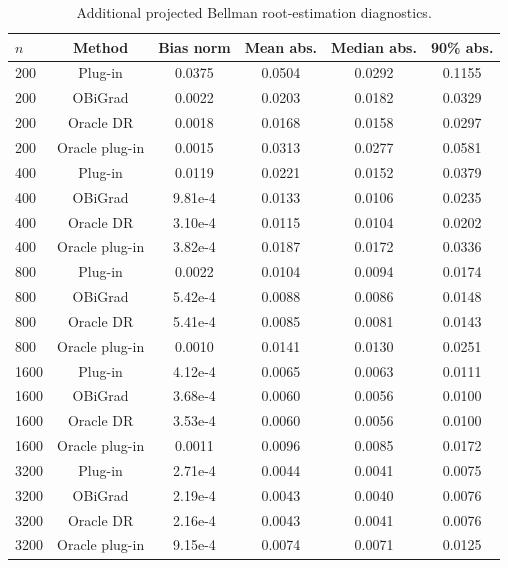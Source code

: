 \begin{table}[t]
\centering
\small
\setlength{\tabcolsep}{5pt}
\caption{Additional projected Bellman root-estimation diagnostics.}
\label{tab:generated-bellman-b3-root-appendix}
\begin{tabular}{lccccc}
\toprule
$n$ & Method & Bias norm & Mean abs. & Median abs. & 90\% abs. \\
\midrule
200 & Plug-in & 0.0375 & 0.0504 & 0.0292 & 0.1155 \\
200 & OBiGrad & 0.0022 & 0.0203 & 0.0182 & 0.0329 \\
200 & Oracle DR & 0.0018 & 0.0168 & 0.0158 & 0.0297 \\
200 & Oracle plug-in & 0.0015 & 0.0313 & 0.0277 & 0.0581 \\
400 & Plug-in & 0.0119 & 0.0221 & 0.0152 & 0.0379 \\
400 & OBiGrad & 9.81e-4 & 0.0133 & 0.0106 & 0.0235 \\
400 & Oracle DR & 3.10e-4 & 0.0115 & 0.0104 & 0.0202 \\
400 & Oracle plug-in & 3.82e-4 & 0.0187 & 0.0172 & 0.0336 \\
800 & Plug-in & 0.0022 & 0.0104 & 0.0094 & 0.0174 \\
800 & OBiGrad & 5.42e-4 & 0.0088 & 0.0086 & 0.0148 \\
800 & Oracle DR & 5.41e-4 & 0.0085 & 0.0081 & 0.0143 \\
800 & Oracle plug-in & 0.0010 & 0.0141 & 0.0130 & 0.0251 \\
1600 & Plug-in & 4.12e-4 & 0.0065 & 0.0063 & 0.0111 \\
1600 & OBiGrad & 3.68e-4 & 0.0060 & 0.0056 & 0.0100 \\
1600 & Oracle DR & 3.53e-4 & 0.0060 & 0.0056 & 0.0100 \\
1600 & Oracle plug-in & 0.0011 & 0.0096 & 0.0085 & 0.0172 \\
3200 & Plug-in & 2.71e-4 & 0.0044 & 0.0041 & 0.0075 \\
3200 & OBiGrad & 2.19e-4 & 0.0043 & 0.0040 & 0.0076 \\
3200 & Oracle DR & 2.16e-4 & 0.0043 & 0.0041 & 0.0076 \\
3200 & Oracle plug-in & 9.15e-4 & 0.0074 & 0.0071 & 0.0125 \\
\bottomrule
\end{tabular}
\end{table}
